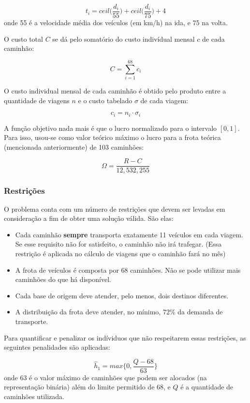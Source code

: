 \documentclass[11pt]{article}
\providecommand{\tightlist}{%
      \setlength{\itemsep}{0pt}\setlength{\parskip}{0pt}}
\begin{document}
\[t_i = ceil\bigg(\frac{d_i}{55}\bigg) + ceil\bigg(\frac{d_i}{75}\bigg) + 4\]
onde 55 é a velocidade média dos veículos (em km/h) na ida, e 75 na
volta.

O custo total \(C\) se dá pelo somatório do custo indivídual mensal
\(c\) de cada caminhão:

\[C = \sum_{i=1}^{68} c_i\]

O custo individual mensal de cada caminhão é obtido pelo produto entre a
quantidade de viagens \(n\) e o custo tabelado \(\sigma\) de cada
viagem:

\[c_i = n_i \cdot \sigma_i \]

A função objetivo nada mais é que o lucro normalizado para o intervalo
\([0,1]\). Para isso, usou-se como valor teórico máximo o lucro para a
frota teórica (mencionada anteriormente) de 103 caminhões:

\[\Omega = \frac{R - C}{12,532,255}\]

    \hypertarget{restriuxe7uxf5es}{%
\subsubsection{Restrições}\label{restriuxe7uxf5es}}

O problema conta com um número de restrições que devem ser levadas em
consideração a fim de obter uma solução válida. São elas:

\begin{itemize}
\tightlist
\item
  Cada caminhão \textbf{sempre} transporta exatamente 11 veículos em
  cada viagem. Se esse requisito não for satisfeito, o caminhão não irá
  trafegar. (Essa restrição é aplicada no cálculo de viagens que o
  caminhão fará no mês)
\item
  A frota de veículos é composta por 68 caminhões. Não se pode utilizar
  mais caminhões do que há disponível.
\item
  Cada base de origem deve atender, pelo menos, dois destinos
  diferentes.
\item
  A distribuição da frota deve atender, no mínimo, 72\% da demanda de
  transporte.
\end{itemize}

Para quantificar e penalizar os indíviduos que não respeitarem essas
restrições, as seguintes penalidades são aplicadas:

\[\hat h_1 = max\{0, \frac{Q - 68}{63}\}\] onde 63 é o valor máximo de
caminhões que podem ser alocados (na representação binária) além do
limite permitido de 68, e \(Q\) é a quantidade de caminhões utilizada.
\end{document}
